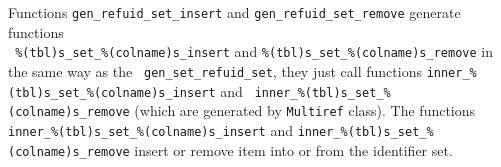\documentclass[deska]{subfiles}
\begin{document}
Functions {\tt gen\_refuid\_set\_insert} and {\tt gen\_refuid\_set\_remove} generate functions \\ {\tt
\%(tbl)s\_set\_\%(colname)s\_insert} and {\tt \%(tbl)s\_set\_\%(colname)s\_remove} in the same way as the {\tt
gen\_set\_refuid\_set}, they just call functions {\tt inner\_\%(tbl)s\_set\_\%(colname)s\_insert} and {\tt
inner\_\%(tbl)s\_set\_\%(colname)s\_remove} (which are generated by {\tt Multiref} class).  The functions {\tt
inner\_\%(tbl)s\_set\_\%(colname)s\_insert} and {\tt inner\_\%(tbl)s\_set\_\%(colname)s\_remove} insert or remove item
into or from the identifier set.
\end{document}
